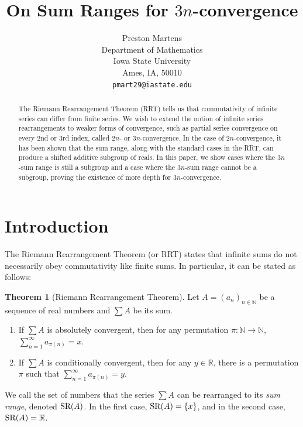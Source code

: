 \documentclass{article}
\title{On Sum Ranges for $3n$-convergence}
\author{ {Preston Martens} \\
	Department of Mathematics\\
	Iowa State University\\
	Ames, IA, 50010 \\
	\texttt{pmart29@iastate.edu} \\
    }
\theoremstyle{definition}
\newtheorem{theorem}{Theorem}[subsection]
\newcommand{\R}{\mathbb{R}}
\newcommand{\N}{\mathbb{N}}
\newcommand{\SR}{\textnormal{SR}}
\begin{document}
\maketitle

\begin{abstract}
	The Riemann Rearrangement Theorem (RRT) tells us that commutativity of infinite series can differ from finite series. We wish to extend the notion of infinite series rearrangements to weaker forms of convergence, such as partial series convergence on every 2nd or 3rd index, called $2n$- or $3n$-convergence. In the case of $2n$-convergence, it has been shown that the sum range, along with the standard cases in the RRT, can produce a shifted additive subgroup of reals. In this paper, we show cases where the $3n$-sum range is still a subgroup and a case where the $3n$-sum range cannot be a subgroup, proving the existence of more depth for $3n$-convergence.
\end{abstract}



\section{Introduction}
The Riemann Rearrangement Theorem (or RRT) states that infinite sums do not necessarily obey commutativity like finite sums. In particular, it can be stated as follows:
\begin{theorem}[Riemann Rearrangement Theorem]
    Let $A = (a_n)_{n \in \N}$ be a sequence of real numbers and $\sum A$ be its sum.
    \begin{enumerate}
        \item[(1)] If $\sum A$ is absolutely convergent, then for any permutation $\pi : \N \to \N$, $\sum_{n=1}^\infty a_{\pi(n)} = x$.
        \item[(2)] If $\sum A$ is conditionally convergent, then for any $y \in \R$, there is a permutation $\pi$ such that $\sum_{n=1}^\infty a_{\pi(n)} = y$.
    \end{enumerate}
\end{theorem}
We call the set of numbers that the series $\sum A$ can be rearranged to its \emph{sum range}, denoted $\SR(A)$. In the first case, $\SR(A) = \{x\}$, and in the second case, $\SR(A) = \R$.
\end{document}
